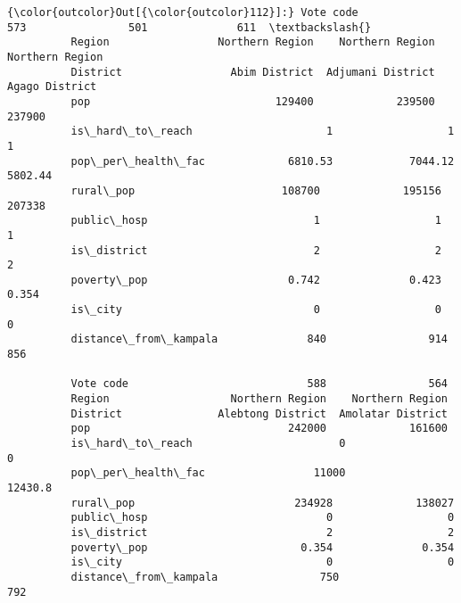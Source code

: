 \documentclass[11pt]{article}
\begin{document}
\begin{Verbatim}[commandchars=\\\{\}]
{\color{outcolor}Out[{\color{outcolor}112}]:} Vote code                          573                501              611  \textbackslash{}
          Region                 Northern Region    Northern Region  Northern Region   
          District                 Abim District  Adjumani District   Agago District   
          pop                             129400             239500           237900   
          is\_hard\_to\_reach                     1                  1                1   
          pop\_per\_health\_fac             6810.53            7044.12          5802.44   
          rural\_pop                       108700             195156           207338   
          public\_hosp                          1                  1                1   
          is\_district                          2                  2                2   
          poverty\_pop                      0.742              0.423            0.354   
          is\_city                              0                  0                0   
          distance\_from\_kampala              840                914              856   
          
          Vote code                            588                564  
          Region                   Northern Region    Northern Region  
          District               Alebtong District  Amolatar District  
          pop                               242000             161600  
          is\_hard\_to\_reach                       0                  0  
          pop\_per\_health\_fac                 11000            12430.8  
          rural\_pop                         234928             138027  
          public\_hosp                            0                  0  
          is\_district                            2                  2  
          poverty\_pop                        0.354              0.354  
          is\_city                                0                  0  
          distance\_from\_kampala                750                792  
\end{Verbatim}
            
\end{document}

